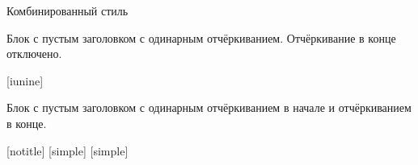 \documentclass{beamer}
\begin{document}
\begin{frame}{Комбинированный стиль}
\begin{block}{}
Блок с пустым заголовком с одинарным отчёркиванием. Отчёркивание в конце отключено.
\end{block}%

[iunine] %

\begin{block}{}
Блок с пустым заголовком с одинарным отчёркиванием в начале и отчёркиванием в конце.
\end{block}%
\end{frame}

[notitle] %
[simple] %
[simple] %
\end{document}

